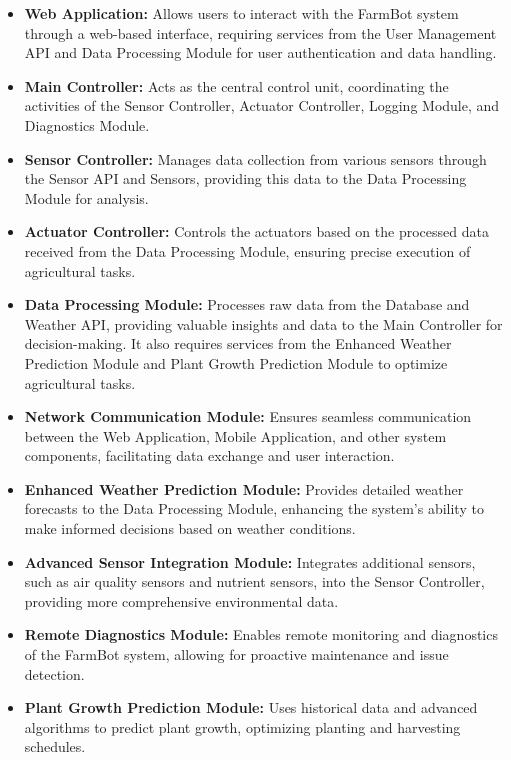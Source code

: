 \begin{itemize}
    \item \textbf{Web Application:} Allows users to interact with the FarmBot system through a web-based interface, requiring services from the User Management API and Data Processing Module for user authentication and data handling.

    \item \textbf{Main Controller:} Acts as the central control unit, coordinating the activities of the Sensor Controller, Actuator Controller, Logging Module, and Diagnostics Module.

    \item \textbf{Sensor Controller:} Manages data collection from various sensors through the Sensor API and Sensors, providing this data to the Data Processing Module for analysis.

    \item \textbf{Actuator Controller:} Controls the actuators based on the processed data received from the Data Processing Module, ensuring precise execution of agricultural tasks.

    \item \textbf{Data Processing Module:} Processes raw data from the Database and Weather API, providing valuable insights and data to the Main Controller for decision-making. It also requires services from the Enhanced Weather Prediction Module and Plant Growth Prediction Module to optimize agricultural tasks.

    \item \textbf{Network Communication Module:} Ensures seamless communication between the Web Application, Mobile Application, and other system components, facilitating data exchange and user interaction.
    
    \item \textbf{Enhanced Weather Prediction Module:} Provides detailed weather forecasts to the Data Processing Module, enhancing the system's ability to make informed decisions based on weather conditions.

    \item \textbf{Advanced Sensor Integration Module:} Integrates additional sensors, such as air quality sensors and nutrient sensors, into the Sensor Controller, providing more comprehensive environmental data.

    \item \textbf{Remote Diagnostics Module:} Enables remote monitoring and diagnostics of the FarmBot system, allowing for proactive maintenance and issue detection.

    \item \textbf{Plant Growth Prediction Module:} Uses historical data and advanced algorithms to predict plant growth, optimizing planting and harvesting schedules.
\end{itemize}

